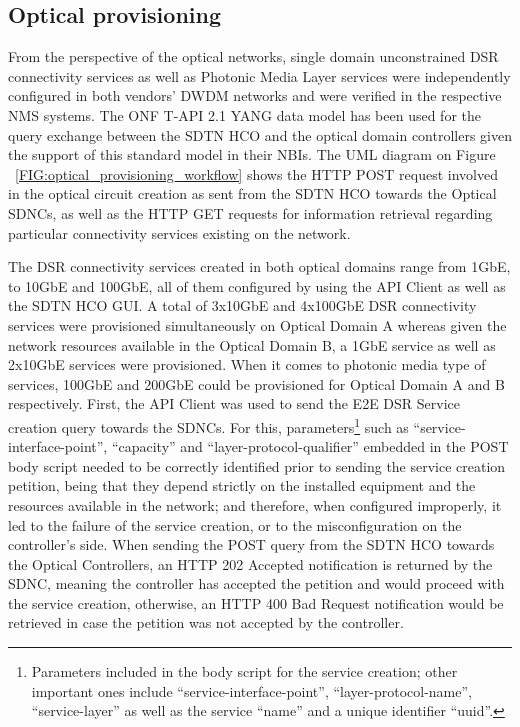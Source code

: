 \documentclass[a4paper,fleqn]{cas-dc}
\begin{document}
\subsection{Optical provisioning}
From the perspective of the optical networks, single domain unconstrained DSR connectivity services as well as Photonic Media Layer services were independently configured in both vendors’ DWDM networks and were verified in the respective NMS systems. The ONF T-API 2.1 YANG data model has been used for the query exchange between the SDTN HCO and the optical domain controllers given the support of this standard model in their NBIs. The UML diagram on Figure ~\ref{FIG:optical_provisioning_workflow} shows the HTTP POST request involved in the optical circuit creation as sent from the SDTN HCO towards the Optical SDNCs, as well as the HTTP GET requests for information retrieval regarding particular connectivity services existing on the network. 

The DSR connectivity services created in both optical domains range from 1GbE, to 10GbE and 100GbE, all of them configured by using the API Client as well as the SDTN HCO GUI. A total of 3x10GbE and 4x100GbE DSR connectivity services were provisioned simultaneously on Optical Domain A whereas given the network resources available in the Optical Domain B, a 1GbE service as well as 2x10GbE services were provisioned. When it comes to photonic media type of services, 100GbE and 200GbE could be provisioned for Optical Domain A and B respectively. 
First, the API Client was used to send the E2E DSR Service creation query towards the SDNCs. For this, parameters\footnote{Parameters included in the body script for the service creation; other important ones include “service-interface-point”, “layer-protocol-name”, “service-layer” as well as the service “name” and a unique identifier “uuid”.} such as “service-interface-point”, “capacity” and “layer-protocol-qualifier” embedded in the POST body script needed to be correctly identified prior to sending the service creation petition, being that they depend strictly on the installed equipment and the resources available in the network; and therefore, when configured improperly, it led to the failure of the service creation, or to the misconfiguration on the controller’s side. When sending the POST query from the SDTN HCO towards the Optical Controllers, an HTTP 202 Accepted notification is returned by the SDNC, meaning the controller has accepted the petition and would proceed with the service creation, otherwise, an HTTP 400 Bad Request notification would be retrieved in case the petition was not accepted by the controller. 
\end{document}
